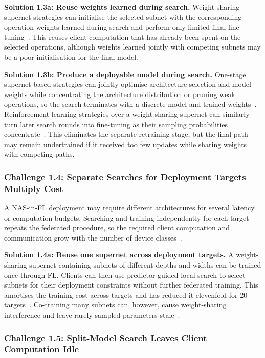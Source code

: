 \noindent\textbf{Solution 1.3a: Reuse weights learned during search.} Weight-sharing supernet strategies can initialise the selected subnet with the corresponding operation weights learned during search and perform only limited final fine-tuning~\cite{medical_image_segmentation_fednas_2024}. This reuses client computation that has already been spent on the selected operations, although weights learned jointly with competing subnets may be a poor initialisation for the final model.

\noindent\textbf{Solution 1.3b: Produce a deployable model during search.} One-stage supernet-based strategies can jointly optimise architecture selection and model weights while concentrating the architecture distribution or pruning weak operations, so the search terminates with a discrete model and trained weights~\cite{dfnas_2020,fed_meta_nas_2025}. Reinforcement-learning strategies over a weight-sharing supernet can similarly turn later search rounds into fine-tuning as their sampling probabilities concentrate~\cite{perfedrlnas_2024}. This eliminates the separate retraining stage, but the final path may remain undertrained if it received too few updates while sharing weights with competing paths.

\subsubsection{Challenge 1.4: Separate Searches for Deployment Targets Multiply Cost}

A NAS-in-FL deployment may require different architectures for several latency or computation budgets. Searching and training independently for each target repeats the federated procedure, so the required client computation and communication grow with the number of device classes~\cite{superfednas_2024}.

\noindent\textbf{Solution 1.4a: Reuse one supernet across deployment targets.} A weight-sharing supernet containing subnets of different depths and widths can be trained once through FL. Clients can then use predictor-guided local search to select subnets for their deployment constraints without further federated training. This amortises the training cost across targets and has reduced it elevenfold for 20 targets~\cite{superfednas_2024}. Co-training many subnets can, however, cause weight-sharing interference and leave rarely sampled parameters stale~\cite{superfednas_2024}.

\subsubsection{Challenge 1.5: Split-Model Search Leaves Client Computation Idle}

